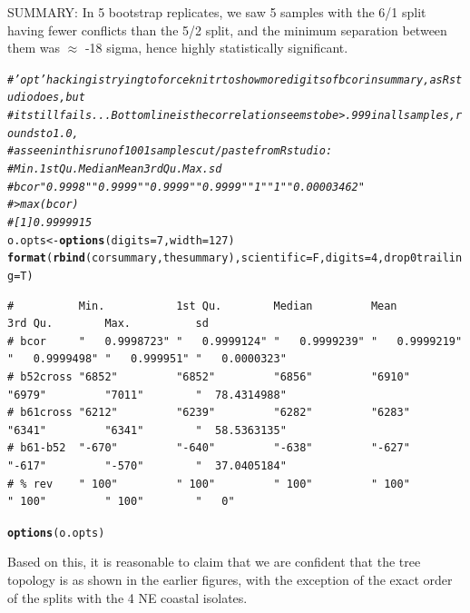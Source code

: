 \documentclass{article}\usepackage[]{graphicx}\usepackage[]{color}
\makeatletter
\newcommand{\hlnum}[1]{\textcolor[rgb]{0.686,0.059,0.569}{#1}}%
\newcommand{\hlcom}[1]{\textcolor[rgb]{0.678,0.584,0.686}{\textit{#1}}}%
\newcommand{\hlstd}[1]{\textcolor[rgb]{0.345,0.345,0.345}{#1}}%
\newcommand{\hlkwb}[1]{\textcolor[rgb]{0.69,0.353,0.396}{#1}}%
\newcommand{\hlkwc}[1]{\textcolor[rgb]{0.333,0.667,0.333}{#1}}%
\newcommand{\hlkwd}[1]{\textcolor[rgb]{0.737,0.353,0.396}{\textbf{#1}}}%
\newenvironment{kframe}{%
 \def\at@end@of@kframe{}%
 \ifinner\ifhmode%
  \def\at@end@of@kframe{\end{minipage}}%
  \begin{minipage}{\columnwidth}%
 \fi\fi%
 \def\FrameCommand##1{\hskip\@totalleftmargin \hskip-\fboxsep
 \colorbox{shadecolor}{##1}\hskip-\fboxsep
     \hskip-\linewidth \hskip-\@totalleftmargin \hskip\columnwidth}%
 \MakeFramed {\advance\hsize-\width
   \@totalleftmargin\z@ \linewidth\hsize
   \@setminipage}}%
 {\par\unskip\endMakeFramed%
 \at@end@of@kframe}
\newenvironment{knitrout}{}{} %
\makeatother
\begin{document}
SUMMARY: In 5 bootstrap replicates, we saw 5 samples with the 6/1 split having fewer
conflicts than the 5/2 split, and the minimum separation between them was $\approx$
-18 sigma, hence highly statistically significant.

\begin{knitrout}\footnotesize
{}\color{fgcolor}\begin{kframe}
\begin{alltt}
\hlcom{# 'opt' hacking is trying to force knitr to show more digits of bcor in summary, as Rstudio does, but}
\hlcom{# it still fails...  Bottom line is the correlation seems to be  > .999 in all samples, rounds to 1.0,}
\hlcom{# as seen in this run of 1001 samples cut/paste from Rstudio:}
\hlcom{#          Min.        1st Qu.     Median      Mean        3rd Qu. Max.   sd             }
\hlcom{# bcor     "   0.9998" "   0.9999" "   0.9999" "   0.9999" "   1"  "   1" "   0.00003462"}
\hlcom{# > max(bcor)}
\hlcom{# [1] 0.9999915}
\hlstd{o.opts} \hlkwb{<-} \hlkwd{options}\hlstd{(}\hlkwc{digits}\hlstd{=}\hlnum{7}\hlstd{,}\hlkwc{width}\hlstd{=}\hlnum{127}\hlstd{)}
\hlkwd{format}\hlstd{(}\hlkwd{rbind}\hlstd{(corsummary,thesummary),}\hlkwc{scientific}\hlstd{=F,}\hlkwc{digits}\hlstd{=}\hlnum{4}\hlstd{,}\hlkwc{drop0trailing}\hlstd{=T)}
\end{alltt}
\begin{verbatim}
#          Min.           1st Qu.        Median         Mean           3rd Qu.        Max.          sd            
# bcor     "   0.9998723" "   0.9999124" "   0.9999239" "   0.9999219" "   0.9999498" "   0.999951" "   0.0000323"
# b52cross "6852"         "6852"         "6856"         "6910"         "6979"         "7011"        "  78.4314988"
# b61cross "6212"         "6239"         "6282"         "6283"         "6341"         "6341"        "  58.5363135"
# b61-b52  "-670"         "-640"         "-638"         "-627"         "-617"         "-570"        "  37.0405184"
# % rev    " 100"         " 100"         " 100"         " 100"         " 100"         " 100"        "   0"
\end{verbatim}
\begin{alltt}
\hlkwd{options}\hlstd{(o.opts)}
\end{alltt}
\end{kframe}
\end{knitrout}

Based on this, it is reasonable to claim that we are confident that the tree topology is as shown in the earlier
figures, with the exception of the exact order of the splits with the 4 NE coastal isolates.
\end{document}
